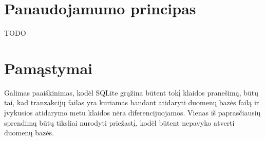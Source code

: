 \section{Panaudojamumo principas}

TODO

\section{Pamąstymai}

Galimas paaiškinimas, kodėl SQLite grąžina būtent tokį klaidos
pranešimą, būtų tai, kad tranzakcijų failas yra kuriamas bandant
atidaryti duomenų bazės failą ir įvykusios atidarymo metu klaidos
nėra diferencijuojamos. Vienas iš paprasčiausių sprendimų būtų
tiksliai nurodyti priežastį, kodėl būtent nepavyko atverti
duomenų bazės.
